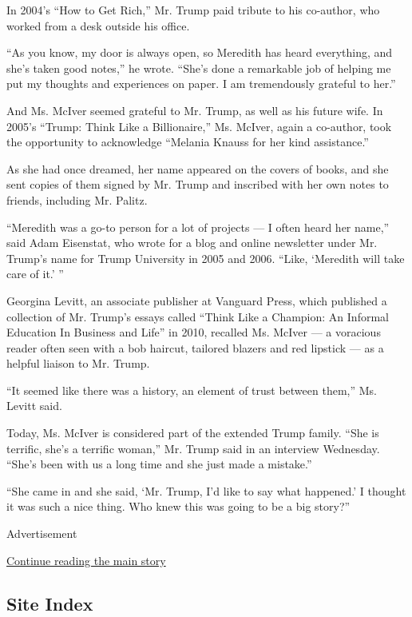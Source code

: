 In 2004's ``How to Get Rich,'' Mr. Trump paid tribute to his co-author,
who worked from a desk outside his office.

``As you know, my door is always open, so Meredith has heard everything,
and she's taken good notes,'' he wrote. ``She's done a remarkable job of
helping me put my thoughts and experiences on paper. I am tremendously
grateful to her.''

And Ms. McIver seemed grateful to Mr. Trump, as well as his future wife.
In 2005's ``Trump: Think Like a Billionaire,'' Ms. McIver, again a
co-author, took the opportunity to acknowledge ``Melania Knauss for her
kind assistance.''

As she had once dreamed, her name appeared on the covers of books, and
she sent copies of them signed by Mr. Trump and inscribed with her own
notes to friends, including Mr. Palitz.

``Meredith was a go-to person for a lot of projects --- I often heard
her name,'' said Adam Eisenstat, who wrote for a blog and online
newsletter under Mr. Trump's name for Trump University in 2005 and 2006.
``Like, `Meredith will take care of it.' ''

Georgina Levitt, an associate publisher at Vanguard Press, which
published a collection of Mr. Trump's essays called ``Think Like a
Champion: An Informal Education In Business and Life'' in 2010, recalled
Ms. McIver --- a voracious reader often seen with a bob haircut,
tailored blazers and red lipstick --- as a helpful liaison to Mr. Trump.

``It seemed like there was a history, an element of trust between
them,'' Ms. Levitt said.

Today, Ms. McIver is considered part of the extended Trump family. ``She
is terrific, she's a terrific woman,'' Mr. Trump said in an interview
Wednesday. ``She's been with us a long time and she just made a
mistake.''

``She came in and she said, `Mr. Trump, I'd like to say what happened.'
I thought it was such a nice thing. Who knew this was going to be a big
story?''

Advertisement

\protect\hyperlink{after-bottom}{Continue reading the main story}

\hypertarget{site-index}{%
\subsection{Site Index}\label{site-index}}

